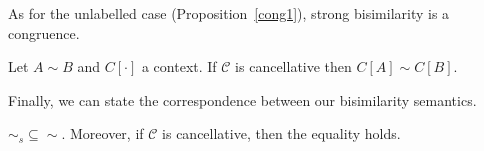 \documentclass{llncs}
\def\odiv{\, {\ominus\hspace{-7.7pt} \div} \,}
\begin{document}

As for the unlabelled case (Proposition~\ref{cong1}), strong bisimilarity is a congruence.

\begin{proposition}
Let $A \sim B$ and $C[\cdot]$ a context.
If $\mathcal{C}$ is cancellative 
then $C[A] \sim C[B]$.
\end{proposition}

%
Finally, we can state the correspondence between our bisimilarity semantics.

\begin{theorem}
$\sim_{\mathit{s}} \subseteq \sim$. Moreover, if $\mathcal{C}$ is cancellative, then the equality holds.
\end{theorem}

\end{document}
